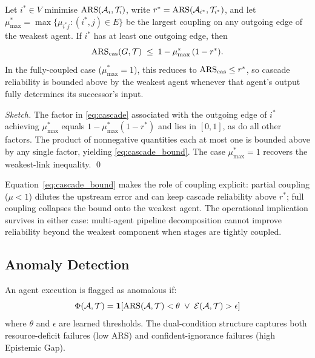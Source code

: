 \begin{theorem}
\label{thm:cascade}
  Let $i^* \in V$ minimise $\mathrm{ARS}(\mathcal{A}_i, \mathcal{T}_i)$, write
  $r^* = \mathrm{ARS}(\mathcal{A}_{i^*}, \mathcal{T}_{i^*})$, and let
  $\mu^*_{\max} = \max\{\mu_{i^*j} : (i^*, j) \in E\}$ be the largest
  coupling on any outgoing edge of the weakest agent. If $i^*$ has at
  least one outgoing edge, then
  \begin{equation}
    \mathrm{ARS}_{\mathrm{cas}}(G, \mathcal{T}) \;\leq\; 1 - \mu^*_{\max}\,(1 - r^*).
    \label{eq:cascade_bound}
  \end{equation}
  In the fully-coupled case ($\mu^*_{\max} = 1$), this reduces to
  $\mathrm{ARS}_{\mathrm{cas}} \leq r^*$, so cascade reliability is bounded above
  by the weakest agent whenever that agent's output fully determines its
  successor's input.
\end{theorem}

\begin{proof}[Sketch]
The factor in \eqref{eq:cascade} associated with the outgoing edge of
$i^*$ achieving $\mu^*_{\max}$ equals $1 - \mu^*_{\max}(1 - r^*)$ and
lies in $[0,1]$, as do all other factors. The product of nonnegative
quantities each at most one is bounded above by any single factor,
yielding \eqref{eq:cascade_bound}. The case $\mu^*_{\max} = 1$ recovers
the weakest-link inequality. \qed
\end{proof}

Equation~\eqref{eq:cascade_bound} makes the role of coupling explicit:
partial coupling ($\mu < 1$) dilutes the upstream error and can keep
cascade reliability above $r^*$; full coupling collapses the bound onto
the weakest agent. The operational implication survives in either case:
multi-agent pipeline decomposition cannot improve reliability beyond the
weakest component when stages are tightly coupled.

\subsection{Anomaly Detection}

An agent execution is flagged as anomalous if:
\begin{equation}
  \Phi(\mathcal{A}, \mathcal{T}) = \mathbf{1}\!\left[\mathrm{ARS}(\mathcal{A}, \mathcal{T}) < \theta \;\lor\;
    \mathcal{E}(\mathcal{A}, \mathcal{T}) > \epsilon\right]
  \label{eq:anomaly}
\end{equation}
where $\theta$ and $\epsilon$ are learned thresholds. The dual-condition
structure captures both resource-deficit failures (low ARS) and
confident-ignorance failures (high Epistemic Gap).

